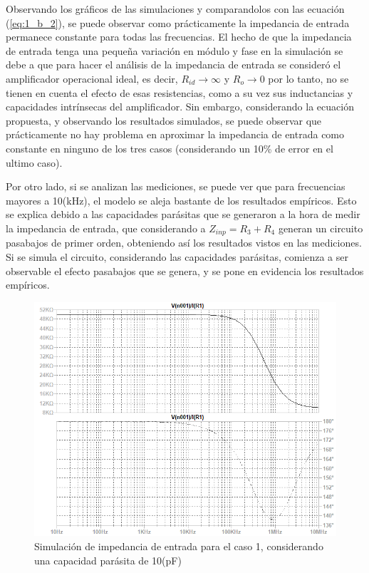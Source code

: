 Observando los gráficos de las simulaciones y comparandolos con las
ecuación (\ref{eq:1_b_2}), se puede observar como prácticamente la
impedancia de entrada permanece constante para todas las frecuencias.
El hecho de que la impedancia de entrada tenga una pequeña variación
en módulo y fase en la simulación se debe a que para hacer el análisis
de la impedancia de entrada se consideró el amplificador operacional
ideal, es decir, $R_{id}\longrightarrow\infty$ y $R_{o}\longrightarrow0$
por lo tanto, no se tienen en cuenta el efecto de esas resistencias,
como a su vez sus inductancias y capacidades intrínsecas del amplificador.
Sin embargo, considerando la ecuación propuesta, y observando los
resultados simulados, se puede observar que prácticamente no hay problema
en aproximar la impedancia de entrada como constante en ninguno de
los tres casos (considerando un 10\% de error en el ultimo caso).

Por otro lado, si se analizan las mediciones, se puede ver que para
frecuencias mayores a 10(kHz), el modelo se aleja bastante de los
resultados empíricos. Esto se explica debido a las capacidades parásitas
que se generaron a la hora de medir la impedancia de entrada, que
considerando a $Z_{inp}=R_{3}+R_{4}$ generan un circuito pasabajos
de primer orden, obteniendo así los resultados vistos en las mediciones.
Si se simula el circuito, considerando las capacidades parásitas,
comienza a ser observable el efecto pasabajos que se genera, y se
pone en evidencia los resultados empíricos.

\begin{figure}[H]
\begin{centering}
\includegraphics[scale=0.5]{../Ex1/iB/Resources1b/zinp1_sim_para}
\par\end{centering}
\begin{centering}
\caption{Simulación de impedancia de entrada para el caso 1, considerando una
capacidad parásita de 10(pF)}
\par\end{centering}
\end{figure}

